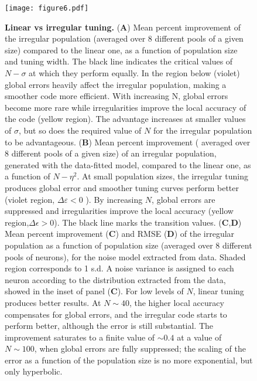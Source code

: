 \documentclass[a4paper]{article}%
\begin{document}
\clearpage

\begin{figure}[ptb]
\centering
\texttt{[image: figure6.pdf]}\caption{\textbf{Linear vs
irregular tuning.} (\textbf{A}) Mean percent improvement of the irregular population (averaged over
8 different pools of a given size) compared to the linear one, as a  function of population size and tuning width. The
black line indicates the critical values of $N-\sigma$ at which they perform
equally. In the region below (violet)  global errors heavily affect the irregular
population, making a smoother code more efficient. With increasing N, global errors become more rare while irregularities improve the local accuracy of the code (yellow region). The advantage increases at smaller values of $\sigma$, but so does the required value of $N$ for the irregular population to be advantageous.   (\textbf{B}) Mean percent improvement ( averaged over 8 different pools of a given size) of
an irregular population, generated with the data-fitted model, compared to the
linear one, as a function of $N-\eta^{2}$. At small population sizes,
the irregular tuning produces global error and smoother tuning curves perform
better (violet region, $\Delta\varepsilon<0 $ ). By increasing $N$, global
errors are suppressed and irregularities improve the local accuracy (yellow region,$\Delta \epsilon > 0$). The black line marks the transition values. (\textbf{C},\textbf{D}) Mean percent improvement (\textbf{C}) and RMSE (\textbf{D}) of the irregular population as a function of population size (averaged over 8
different pools of neurons), for the noise model extracted from data. Shaded
region corresponds to 1 s.d. A noise variance is assigned to each neuron according to the distribution extracted from the data, showed
in the inset of panel (\textbf{C}). For low levels of $N$, linear tuning produces better results.
At $N\sim40$, the higher local accuracy compensates for global errors,
and the irregular code starts to perform better, although the error is still substantial. The improvement saturates to
a finite value of $\sim0.4$ at a value of  $N\sim100$, when
global errors are fully suppressed; the scaling of the error as a function of the population size is no more exponential, but only hyperbolic.}
\label{Fig:6}
\end{figure}
\clearpage
\end{document}
